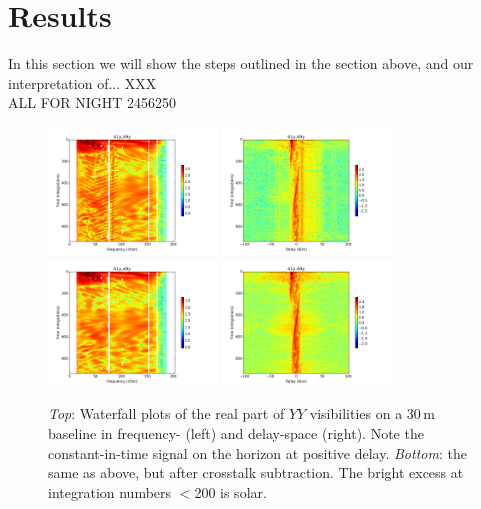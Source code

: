\documentclass[10pt,a4paper,notitlepage]{article}
\begin{document}
\section{Results}

In this section we will show the steps outlined in the section above, and our interpretation of... XXX\\

ALL FOR NIGHT 2456250\\


\begin{figure}
\centering
\includegraphics[width=0.4\textwidth]{6250_C.png}
\includegraphics[width=0.4\textwidth]{6250_C_d.png}
\includegraphics[width=0.4\textwidth]{6250_Cx.png}
\includegraphics[width=0.4\textwidth]{6250_Cx_d.png}
\caption{\textit{Top}: Waterfall plots of the real part of $YY$ visibilities on a 30\,m baseline in frequency- (left) and delay-space (right). Note the constant-in-time signal on the horizon at positive delay. \textit{Bottom}: the same as above, but after crosstalk subtraction. The bright excess at integration numbers $<$200 is solar.}
\label{fig:waterfalls}
\end{figure}
\end{document}
